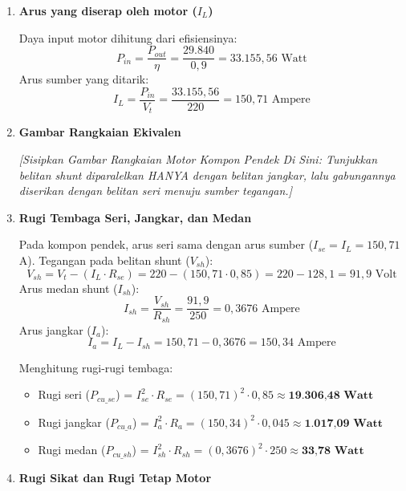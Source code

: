 \documentclass[12pt, a4paper]{article}
\begin{document}
\begin{enumerate}[label=\alph*.]
    \item \textbf{Arus yang diserap oleh motor ($I_L$)}

    Daya input motor dihitung dari efisiensinya:
    \[
        P_{in} = \frac{P_{out}}{\eta} = \frac{29.840}{0,9} = 33.155,56 \text{ Watt}
    \]
    Arus sumber yang ditarik:
    \[
        I_L = \frac{P_{in}}{V_t} = \frac{33.155,56}{220} = 150,71 \text{ Ampere}
    \]

    \vspace{0.3cm}

    \item \textbf{Gambar Rangkaian Ekivalen}

    \textit{[Sisipkan Gambar Rangkaian Motor Kompon Pendek Di Sini: Tunjukkan belitan shunt diparalelkan HANYA dengan belitan jangkar, lalu gabungannya diserikan dengan belitan seri menuju sumber tegangan.]}

    \vspace{0.3cm}

    \item \textbf{Rugi Tembaga Seri, Jangkar, dan Medan}

    Pada kompon pendek, arus seri sama dengan arus sumber ($I_{se} = I_L = 150,71$ A).
    Tegangan pada belitan shunt ($V_{sh}$):
    \[
        V_{sh} = V_t - (I_L \cdot R_{se}) = 220 - (150,71 \cdot 0,85) = 220 - 128,1 = 91,9 \text{ Volt}
    \]
    Arus medan shunt ($I_{sh}$):
    \[
        I_{sh} = \frac{V_{sh}}{R_{sh}} = \frac{91,9}{250} = 0,3676 \text{ Ampere}
    \]
    Arus jangkar ($I_a$):
    \[
        I_a = I_L - I_{sh} = 150,71 - 0,3676 = 150,34 \text{ Ampere}
    \]

    Menghitung rugi-rugi tembaga:
    \begin{itemize}
        \item Rugi seri ($P_{cu\_se}$) = $I_{se}^2 \cdot R_{se} = (150,71)^2 \cdot 0,85 \approx \textbf{19.306,48 Watt}$
        \item Rugi jangkar ($P_{cu\_a}$) = $I_a^2 \cdot R_a = (150,34)^2 \cdot 0,045 \approx \textbf{1.017,09 Watt}$
        \item Rugi medan ($P_{cu\_sh}$) = $I_{sh}^2 \cdot R_{sh} = (0,3676)^2 \cdot 250 \approx \textbf{33,78 Watt}$
    \end{itemize}

    \vspace{0.3cm}

    \item \textbf{Rugi Sikat dan Rugi Tetap Motor}


\end{enumerate}
\end{document}
